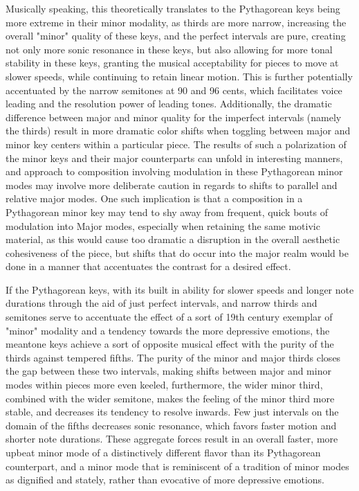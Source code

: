 Musically speaking, this theoretically translates to the Pythagorean
keys being more extreme in their minor modality, as thirds are more
narrow, increasing the overall "minor" quality of these keys, and the
perfect intervals are pure, creating not only more sonic resonance in
these keys, but also allowing for more tonal stability in these keys,
granting the musical acceptability for pieces to move at slower speeds,
while continuing to retain linear motion. This is further potentially
accentuated by the narrow semitones at 90 and 96 cents, which
facilitates voice leading and the resolution power of leading tones.
Additionally, the dramatic difference between major and minor quality
for the imperfect intervals (namely the thirds) result in more dramatic
color shifts when toggling between major and minor key centers within a
particular piece. The results of such a polarization of the minor keys
and their major counterparts can unfold in interesting manners, and
approach to composition involving modulation in these Pythagorean minor
modes may involve more deliberate caution in regards to shifts to
parallel and relative major modes. One such implication is that a
composition in a Pythagorean minor key may tend to shy away from
frequent, quick bouts of modulation into Major modes, especially when
retaining the same motivic material, as this would cause too dramatic a
disruption in the overall aesthetic cohesiveness of the piece, but
shifts that do occur into the major realm would be done in a manner that
accentuates the contrast for a desired effect.

If the Pythagorean keys, with its built in ability for slower speeds and
longer note durations through the aid of just perfect intervals, and
narrow thirds and semitones serve to accentuate the effect of a sort of
19th century exemplar of "minor" modality and a tendency towards the
more depressive emotions, the meantone keys achieve a sort of opposite
musical effect with the purity of the thirds against tempered fifths.
The purity of the minor and major thirds closes the gap between these
two intervals, making shifts between major and minor modes within pieces
more even keeled, furthermore, the wider minor third, combined with the
wider semitone, makes the feeling of the minor third more stable, and
decreases its tendency to resolve inwards. Few just intervals on the
domain of the fifths decreases sonic resonance, which favors faster
motion and shorter note durations. These aggregate forces result in an
overall faster, more upbeat minor mode of a distinctively different
flavor than its Pythagorean counterpart, and a minor mode that is
reminiscent of a tradition of minor modes as dignified and stately,
rather than evocative of more depressive emotions.


